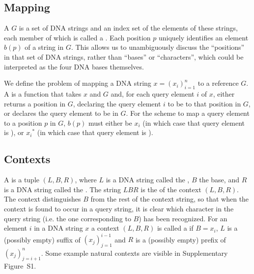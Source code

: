 \subsection{Mapping}
A  $G$ is a set of DNA strings and an index set of the elements of these strings, each member of which is called a . Each position $p$ uniquely identifies an element $b(p)$ of a string in $G$. This allows us to unambiguously discuss the ``positions'' in that set of DNA strings, rather than ``bases'' or ``characters'', which could be interpreted as the four DNA bases themselves.

 We define the problem of mapping a  DNA string $x=(x_i)_{i=1}^n$ to a reference $G$. 
A  is a function that takes $x$ and $G$ and, for each query element $i$ of $x$, either returns a position in $G$, declaring the query element $i$ to be  to that position in $G$, or declares the query element to be  in $G$. For the scheme to map a query element to a position $p$ in $G$, $b(p)$ must either be $x_i$ (in which case that query element is ), or ${x_i}^*$ (in which case that query element is ). 

\subsection{Contexts}
A  is a tuple $(L, B, R)$, where $L$ is a DNA string called the , $B$ the base, and $R$ is a DNA string called the . The string $LBR$ is the  of the context $(L, B, R)$. The context distinguishes $B$ from the rest of the context string, so that when the context is found to occur in a query string, it is clear which character in the query string (i.e. the one corresponding to $B$) has been recognized.
For an element $i$ in a DNA string $x$ a context $(L, B, R)$ is called a  if $B=x_i$,  $L$ is a (possibly empty) suffix of $(x_j)_{j=1}^{i-1}$ and $R$ is a (possibly empty) prefix of $(x_j)_{j=i+1}^n$. Some example natural contexts are visible in Supplementary Figure~S1. %


